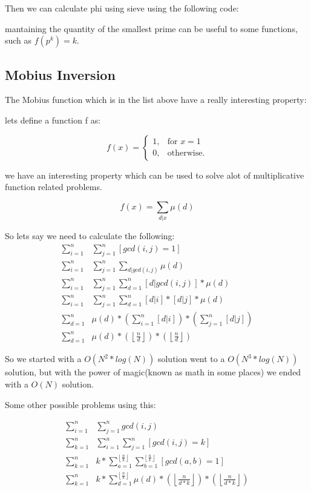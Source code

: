     Then we can calculate phi using sieve using the following code:

    

    mantaining the quantity of the smallest prime can be useful to some functions, such as $f(p^k) = k$.

    
    \subsection{Mobius Inversion}

    The Mobius function which is in the list above have a really interesting property:

    lets define a function f as:

    $$
        f(x) = 
      \begin{cases}
        1, & \text{for } x = 1 \\
        0, & \text{otherwise.} 
      \end{cases}
    $$
    
    we have an interesting property which can be used to solve alot of multiplicative function related problems.

    $$
        f(x)  = \sum_{d|x}\mu(d)
    $$

    So lets say we need to calculate the following:
    \begin{align*}
        \sum_{i=1}^{n}& \sum_{j=1}^{n} [gcd(i,j) = 1] \\
        \sum_{i=1}^{n}& \sum_{j=1}^{n} \sum_{d|gcd(i,j)}\mu(d) \\
        \sum_{i=1}^{n}& \sum_{j=1}^{n} \sum_{d = 1}^{n} [d|gcd(i,j)]*\mu(d) \\
        \sum_{i=1}^{n}& \sum_{j=1}^{n} \sum_{d = 1}^{n} [d|i]*[d|j]*\mu(d) \\
       \sum_{d = 1}^{n}& \mu(d) * (\sum_{i=1}^{n}[d|i]) * (\sum_{j=1}^{n}[d|j]) \\
       \sum_{d = 1}^{n}& \mu(d) * (\left\lfloor \frac{n}{d} \right\rfloor) * (\left\lfloor \frac{n}{d} \right\rfloor) 
    \end{align*}

    So we started with a $O(N^2 * log(N))$ solution went to a $O(N^3 * log(N))$ solution, 
    but with the power of magic(known as math in some places) we ended with a $O(N)$ solution.

    Some other possible problems using this:
    
    \begin{align*}
        \sum_{i=1}^{n}& \sum_{j=1}^{n} gcd(i,j) \\
        \sum_{k=1}^{n}& \sum_{i=1}^{n} \sum_{j=1}^{n} [gcd(i,j) = k] \\
        \sum_{k=1}^{n}& k * \sum_{a=1}^{\left\lfloor \frac{n}{k} \right\rfloor} 
        \sum_{b=1}^{\left\lfloor \frac{n}{k} \right\rfloor} [gcd(a,b) = 1] \\
        \sum_{k=1}^{n}& k * \sum_{d = 1}^{\left\lfloor \frac{n}{k} \right\rfloor} \mu(d) * (\left\lfloor \frac{n}{d*k} \right\rfloor) * (\left\lfloor \frac{n}{d*k} \right\rfloor) 
    \end{align*}

